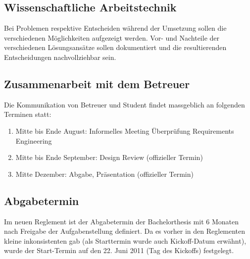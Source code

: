 \subsection{Wissenschaftliche Arbeitstechnik}
Bei Problemen respektive Entscheiden während der Umsetzung sollen die verschiedenen Möglichkeiten aufgezeigt werden. Vor- und Nachteile der verschiedenen Lösungsansätze sollen dokumentiert und die resultierenden Entscheidungen nachvollziehbar sein.
\subsection{Zusammenarbeit mit dem Betreuer}
Die Kommunikation von Betreuer und Student findet massgeblich an folgenden Terminen statt:
\begin{enumerate}
	\item Mitte bis Ende August: Informelles Meeting Überprüfung Requirements Engineering
	\item Mitte bis Ende September: Design Review (offizieller Termin)
	\item Mitte Dezember: Abgabe, Präsentation (offizieller Termin)
\end{enumerate}
\subsection{Abgabetermin}
Im neuen Reglement ist der Abgabetermin der Bachelorthesis mit 6 Monaten nach Freigabe der Aufgabenstellung definiert. Da es vorher in den Reglementen kleine inkonsistenten gab (als Starttermin wurde auch Kickoff-Datum erwähnt), wurde der Start-Termin auf den 22. Juni 2011 (Tag des Kickoffs) festgelegt.
